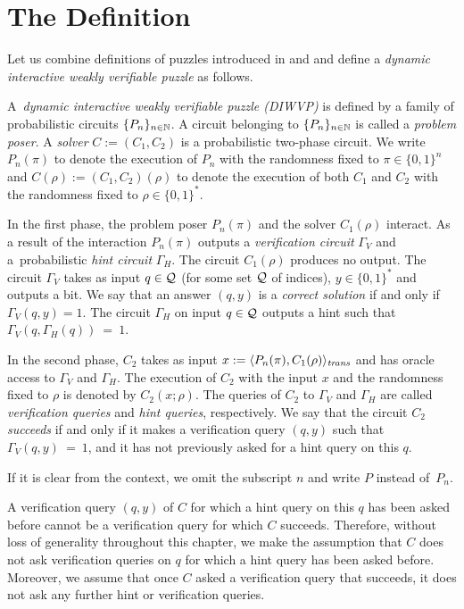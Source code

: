 \section{The Definition}
\label{section:wvp}
Let us combine definitions of puzzles introduced in \cite{dodis2009security} and \cite{holenstein2011general}
and define a \textit{dynamic interactive weakly verifiable puzzle} as follows.
\begin{definition}
  \label{def:dwvp}%
  A~\textit{dynamic interactive weakly verifiable puzzle (DIWVP)} is defined by a family of probabilistic circuits $\{P_n\}_{n \in \mathbb{N}}$.
  A circuit belonging to $\{P_n\}_{n \in \mathbb{N}}$ is called a \textit{problem poser}.
  A \textit{solver} $C := (C_1, C_2)$ is a probabilistic two-phase circuit.
  We write $P_n(\pi)$ to denote the execution of $P_n$ with the randomness fixed to $\pi \in \{0,1\}^n$ and $C(\rho) := (C_1,C_2)(\rho)$
  to denote the execution of both $C_1$ and $C_2$ with the randomness fixed to $\rho \in \{0,1\}^{*}$.

  In the first phase, the problem poser $P_n(\pi)$ and the solver $C_1(\rho)$ interact.
  As a result of the interaction $P_n(\pi)$ outputs a \textit{verification circuit} $\Gamma_{V}$ and a~probabilistic \textit{hint circuit} $\Gamma_{H}$.
  The circuit $C_1(\rho)$ produces no output. The circuit $\Gamma_{V}$ takes as input $q \in \mathcal{Q}$ (for some set $\mathcal{Q}$ of indices),
  $y \in \{0,1\}^*$ and outputs a bit. We say that an answer $(q,y)$ is a \textit{correct solution} if and only if $\Gamma_V(q,y) = 1$.
  The circuit $\Gamma_H$ on input $q \in \mathcal{Q}$ outputs a hint such that $\Gamma_V(q,\Gamma_H(q))~=~1$.

  In the second phase, $C_2$ takes as input $x := \langle P_n(\pi), C_1(\rho) \rangle_{\operatorname{\mathit{trans}}}$
  and has oracle access to $\Gamma_V$ and $\Gamma_H$.
  The execution of $C_2$ with the input $x$ and the randomness fixed to $\rho$
  is denoted by $C_2(x; \rho)$. The queries of $C_2$ to $\Gamma_V$ and $\Gamma_H$ are called \textit{verification queries} and \textit{hint queries}, respectively.
  We say that the circuit $C_2$ \textit{succeeds} if and only if it makes a verification query $(q,y)$ such that $\Gamma_V(q,y)~=~1$,
  and it has not previously asked for a hint query on this $q$.
\end{definition}

If it is clear from the context, we omit the subscript $n$ and write $P$ instead of~$P_n$.

A verification query $(q,y)$ of $C$ for which a hint query on this $q$ has been asked before cannot be a verification query for which $C$ succeeds.
Therefore, without loss of generality throughout this chapter, we make the assumption that $C$ does not ask verification queries on $q$
for which a hint query has been asked before. Moreover, we assume that once $C$ asked a verification query that succeeds,
it does not ask any further hint or verification queries.

